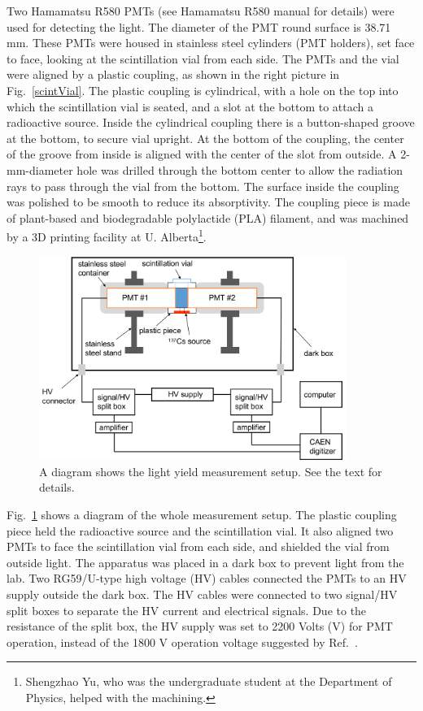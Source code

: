 Two Hamamatsu R580 PMTs (see Hamamatsu R580 manual\cite{pmtR580} for details) were used for detecting the light. The diameter of the PMT round surface is 38.71 mm. These PMTs were housed in stainless steel cylinders (PMT holders), set face to face, looking at the scintillation vial from each side. The PMTs and the vial were aligned by a plastic coupling, as shown in the right picture in Fig.~\ref{scintVial}. The plastic coupling is cylindrical, with a hole on the top into which the scintillation vial is seated, and a slot at the bottom to attach a radioactive source. Inside the cylindrical coupling there is a button-shaped groove at the bottom, to secure vial upright. At the bottom of the coupling, the center of the groove from inside is aligned with the center of the slot from outside. A 2-mm-diameter hole was drilled through the bottom center to allow the radiation rays to pass through the vial from the bottom. The surface inside the coupling was polished to be smooth to reduce its absorptivity. The coupling piece is made of plant-based and biodegradable polylactide (PLA) filament, and was machined by a 3D printing facility at U. Alberta\footnote{Shengzhao Yu, who was the undergraduate student at the Department of Physics, helped with the machining.}.

\begin{figure}[htbp]
	\centering	
	\includegraphics[width=10cm]{teLSsetup.png}
	\caption[A diagram shows the light yield measurement setup.]{A diagram shows the light yield measurement setup. See the text for details.}
	\label{teLSsetup}
\end{figure}

Fig.~\ref{teLSsetup} shows a diagram of the whole measurement setup. The plastic coupling piece held the radioactive source and the scintillation vial. It also aligned two PMTs to face the scintillation vial from each side, and shielded the vial from outside light. The apparatus was placed in a dark box to prevent light from the lab. Two RG59/U-type high voltage (HV) cables connected the PMTs to an HV supply outside the dark box. The HV cables were connected to two signal/HV split boxes to separate the HV current and electrical signals. Due to the resistance of the split box, the HV supply was set to 2200 Volts (V) for PMT operation, instead of the 1800 V operation voltage suggested by Ref.~\cite{pmtR580}. 

